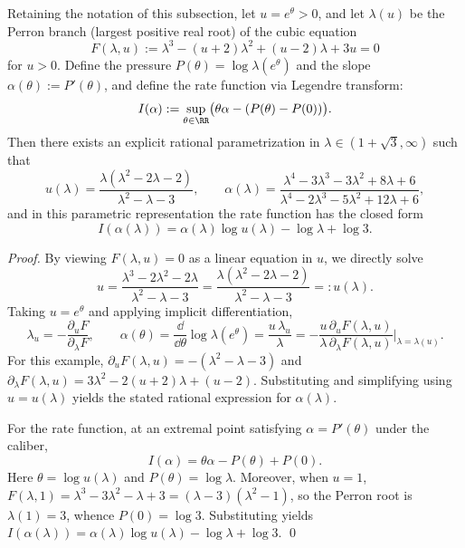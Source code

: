 \begin{proposition}\label{prop:vector-potential-phi-minus-ldp-param}
Retaining the notation of this subsection, let \(u=e^{\theta}>0\), and let \(\lambda(u)\) be the Perron branch (largest positive real root) of the cubic equation
\[
F(\lambda,u):=\lambda^3-(u+2)\lambda^2+(u-2)\lambda+3u=0
\]
for \(u>0\).
Define the pressure \(P(\theta)=\log\lambda(e^\theta)\) and the slope \(\alpha(\theta):=P'(\theta)\), and define the rate function via Legendre transform:
\[
I(\alpha):=\sup_{\theta\in\RR}\bigl(\theta\alpha-(P(\theta)-P(0))\bigr).
\]
Then there exists an explicit rational parametrization in \(\lambda\in(1+\sqrt3,\infty)\) such that
\[
u(\lambda)=\frac{\lambda(\lambda^{2}-2\lambda-2)}{\lambda^{2}-\lambda-3},
\qquad
\alpha(\lambda)=\frac{\lambda^{4}-3\lambda^{3}-3\lambda^{2}+8\lambda+6}{\lambda^{4}-2\lambda^{3}-5\lambda^{2}+12\lambda+6},
\]
and in this parametric representation the rate function has the closed form
\[
I(\alpha(\lambda))=\alpha(\lambda)\log u(\lambda)-\log\lambda+\log 3.
\]
\end{proposition}
\begin{proof}
By viewing \(F(\lambda,u)=0\) as a linear equation in \(u\), we directly solve
\[
u=\frac{\lambda^{3}-2\lambda^{2}-2\lambda}{\lambda^{2}-\lambda-3}
=\frac{\lambda(\lambda^{2}-2\lambda-2)}{\lambda^{2}-\lambda-3}
=:u(\lambda).
\]
Taking \(u=e^{\theta}\) and applying implicit differentiation,
\[
\lambda_u=-\frac{\partial_u F}{\partial_\lambda F},
\qquad
\alpha(\theta)=\frac{\dd}{\dd\theta}\log\lambda(e^\theta)=\frac{u\,\lambda_u}{\lambda}
=-\frac{u\,\partial_u F(\lambda,u)}{\lambda\,\partial_\lambda F(\lambda,u)}\Bigg|_{\lambda=\lambda(u)}.
\]
For this example,
\(
\partial_u F(\lambda,u)=-(\lambda^2-\lambda-3)
\)
and
\(
\partial_\lambda F(\lambda,u)=3\lambda^2-2(u+2)\lambda+(u-2)
\).
Substituting and simplifying using \(u=u(\lambda)\) yields the stated rational expression for \(\alpha(\lambda)\).
\par
For the rate function, at an extremal point satisfying \(\alpha=P'(\theta)\) under the caliber,
\[
I(\alpha)=\theta\alpha-P(\theta)+P(0).
\]
Here \(\theta=\log u(\lambda)\) and \(P(\theta)=\log\lambda\). Moreover, when \(u=1\),
\(
F(\lambda,1)=\lambda^{3}-3\lambda^{2}-\lambda+3=(\lambda-3)(\lambda^{2}-1)
\),
so the Perron root is \(\lambda(1)=3\), whence \(P(0)=\log 3\).
Substituting yields
\(
I(\alpha(\lambda))=\alpha(\lambda)\log u(\lambda)-\log\lambda+\log 3
\).
\qed
\end{proof}

